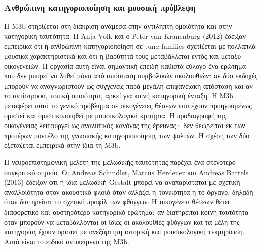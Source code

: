 \documentclass[11pt,a4paper]{article}
\begin{document}
\subsubsection{Ανθρώπινη κατηγοριοποίηση και μουσική πρόβλεψη}

Η M3b στηρίζεται στη διάκριση ανάμεσα στην αντιληπτή ομοιότητα και στην κατηγορική ταυτότητα. Η Anja Volk και ο Peter van Kranenburg (2012) έδειξαν εμπειρικά ότι η ανθρώπινη κατηγοριοποίηση σε tune families σχετίζεται με πολλαπλά μουσικά χαρακτηριστικά και ότι η βαρύτητά τους μεταβάλλεται εντός και μεταξύ οικογενειών. Η εργασία αυτή είναι σημαντική επειδή καθιστά εύλογο ένα ερώτημα που δεν μπορεί να λυθεί μόνο από απόσταση συμβολικών ακολουθιών: αν δύο εκδοχές μπορούν να αναγνωριστούν ως συγγενείς παρά μεγάλη επιφανειακή απόσταση και αν το αντίστροφο, τοπική ομοιότητα, αρκεί για κοινή κατηγορική ένταξη. Η M3b μεταφέρει αυτό το γενικό πρόβλημα σε οικογένειες θέσεων που έχουν προηγουμένως οριστεί και οριστικοποιηθεί με μουσικολογικά κριτήρια. Η προδιαγραφή της οικογένειας λειτουργεί ως αναλυτικός κανόνας της έρευνας· δεν θεωρείται εκ των προτέρων μοντέλο της γνωσιακής κατηγοριοποίησης των ψαλτών. Η σχέση των δύο εξετάζεται εμπειρικά στην ίδια τη M3b.

Η νευροεπιστημονική μελέτη της μελωδικής ταυτότητας παρέχει ένα στενότερο συγκριτικό σημείο. Οι Andreas Schindler, Marcus Herdener και Andreas Bartels (2013) έδειξαν ότι η ίδια μελωδική Gestalt μπορεί να αναπαρίσταται με σχετική αναλλοιότητα στον ακουστικό φλοιό όταν αλλάζει η τονικότητα ή το όργανο, δηλαδή όταν διατηρείται το σχετικό προφίλ των φθόγγων. Η οικογένεια θέσεων θέτει διαφορετικό και αυστηρότερο κατηγορικό ερώτημα: αν διατηρείται κοινή ταυτότητα όταν μπορούν να μεταβάλλονται οι ίδιες οι ακολουθίες φθόγγων και τα μέλη της κατηγορίας έχουν οριστεί με ανεξάρτητη ιστορική και μουσικολογική τεκμηρίωση. Αυτό είναι το ειδικό αντικείμενο της M3b.
\end{document}
